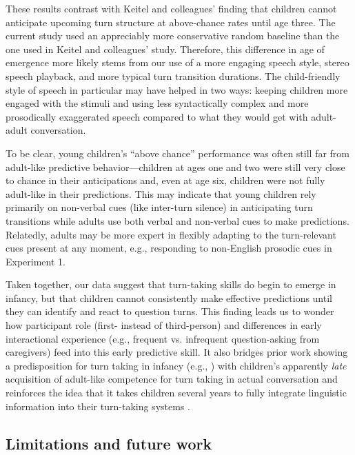 \documentclass[authoryear, 12pt]{elsarticle}
\begin{document}
These results contrast with Keitel and colleagues' \citeyearpar{keitel2013} finding that children cannot anticipate upcoming turn structure at above-chance rates until age three. The current study used an appreciably more conservative random baseline than the one used in Keitel and colleagues' study. Therefore, this difference in age of emergence more likely stems from our use of a more engaging speech style, stereo speech playback, and more typical turn transition durations. The child-friendly style of speech in particular may have helped in two ways: keeping children more engaged with the stimuli and using less syntactically complex and more prosodically exaggerated speech \citep{fernald1989, werker1989, snow1977} compared to what they would get with adult-adult conversation.

To be clear, young children's ``above chance'' performance was often still far from adult-like predictive behavior---children at ages one and two were still very close to chance in their anticipations and, even at age six, children were not fully adult-like in their predictions. This may indicate that young children rely primarily on non-verbal cues (like inter-turn silence) in anticipating turn transitions while adults use both verbal and non-verbal cues to make predictions. Relatedly, adults may be more expert in flexibly adapting to the turn-relevant cues present at any moment, e.g., responding to non-English prosodic cues in Experiment 1.

Taken together, our data suggest that turn-taking skills do begin to emerge in infancy, but that children cannot consistently make effective predictions until they can identify and react to question turns. This finding leads us to wonder how participant role (first- instead of third-person) and differences in early interactional experience (e.g., frequent vs. infrequent question-asking from caregivers) feed into this early predictive skill. It also bridges prior work showing a predisposition for turn taking in infancy (e.g., \citealp{bateson1975, hilbrink2015, jaffe2001, snow1977}) with children's apparently \textit{late} acquisition of adult-like competence for turn taking in actual conversation \citep{casillas2016, garvey1984, garvey1981, ervin-tripp1979} and reinforces the idea that it takes children several years to fully integrate linguistic information into their turn-taking systems \citep{casillas2016,garvey1981}.

\subsection*{Limitations and future work}
\end{document}
